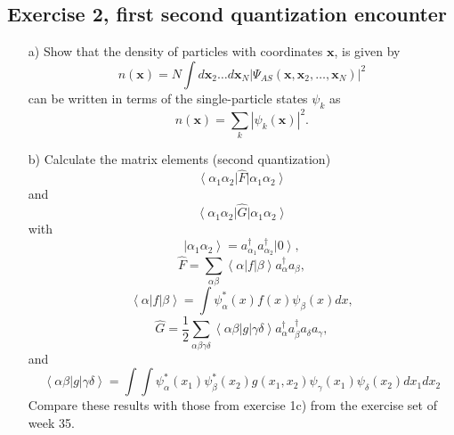 \documentclass[prc]{revtex4}
\newcommand{\bra}[1]{\left\langle #1 \right|}
\newcommand{\ket}[1]{\left| #1 \right\rangle}
\begin{document}
\subsection*{Exercise 2, first second quantization encounter}
\begin{enumerate}
\item[a)] Show that the density of particles with coordinates $\mathbf{x}$, is given by
\[
  n(\mathbf{x}) = N \int d\mathbf{x}_2 \dots d\mathbf{x}_N |\Psi_{AS}(\mathbf{x},\mathbf{x}_2,\dots,\mathbf{x}_N)|^2 
\]
can be written in terms of the single-particle states $\psi_k$ as 
\[
 n(\mathbf{x}) = \sum_k|\psi_k(\mathbf{x})|^2.
\]
\item[b)] Calculate the matrix elements (second quantization)
\[
\bra{\alpha_{1}\alpha_{2}}\hat{F}\ket{\alpha_{1}\alpha_{2}}
\]
and
\[
\bra{\alpha_{1}\alpha_{2}}\hat{G}\ket{\alpha_{1}\alpha_{2}}
\]
with
\[
\ket{\alpha_{1}\alpha_{2}}=a_{\alpha_{1}}^{\dagger}
a_{\alpha_{2}}^{\dagger}\ket{0} ,
\]
\[
\hat{F}=\sum_{\alpha\beta}\bra{\alpha}f\ket{\beta}
a_{\alpha}^{\dagger}a_{\beta}  ,
\]
\[
\bra{\alpha}f\ket{\beta}=\int \psi_{\alpha}^{*}(x)f(x)\psi_{\beta}(x)dx ,
\]
\[
\hat{G} = \frac{1}{2}\sum_{\alpha\beta\gamma\delta}
\bra{\alpha\beta}g\ket{\gamma\delta}
a_{\alpha}^{\dagger}a_{\beta}^{\dagger}a_{\delta}a_{\gamma} ,
\]
and
\[
\bra{\alpha\beta}g\ket{\gamma\delta}=
\int\int \psi_{\alpha}^{*}(x_{1})\psi_{\beta}^{*}(x_{2})g(x_{1},
x_{2})\psi_{\gamma}(x_{1})\psi_{\delta}(x_{2})dx_{1}dx_{2}
\]
Compare these results with those from exercise 1c) from the exercise set of week 35.

\end{enumerate}
\end{document}
